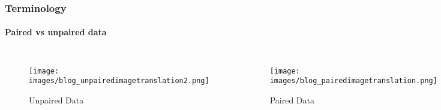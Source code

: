 \begin{frame}
\frametitle{Terminology}
\framesubtitle{Paired vs unpaired data}
\begin{columns}
    \centering    
    \begin{figure}
        \texttt{[image: images/blog\_unpairedimagetranslation2.png]}
        \caption{Unpaired Data}
    \end{figure}

    \centering    
    \begin{figure}        
        \texttt{[image: images/blog\_pairedimagetranslation.png]}
        \caption{Paired Data}
    \end{figure}
    \end{columns}
\end{frame}
